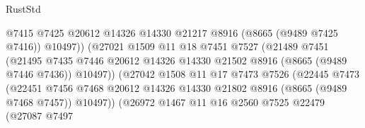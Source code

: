 \begin{lexlean}{RustStd}
\begin{coremodule}
                                        @7415
                                        @7425
                                        @20612
                                        @14326
                                        @14330
                                        @21217
                                        @8916
                                        (@8665 (@9489 @7425 @7416))
                                        @10497))
                                    (@27021
                                      @1509
                                      @11
                                      @18
                                      @7451
                                      @7527
                                      (@21489
                                        @7451
                                        (@21495
                                          @7435
                                          @7446
                                          @20612
                                          @14326
                                          @14330
                                          @21502
                                          @8916
                                          (@8665 (@9489 @7446 @7436))
                                          @10497))
                                      (@27042
                                        @1508
                                        @11
                                        @17
                                        @7473
                                        @7526
                                        (@22445
                                          @7473
                                          (@22451
                                            @7456
                                            @7468
                                            @20612
                                            @14326
                                            @14330
                                            @21802
                                            @8916
                                            (@8665 (@9489 @7468 @7457))
                                            @10497))
                                        (@26972
                                          @1467
                                          @11
                                          @16
                                          @2560
                                          @7525
                                          @22479
                                          (@27087
                                            @7497

\end{coremodule}
\end{lexlean}
